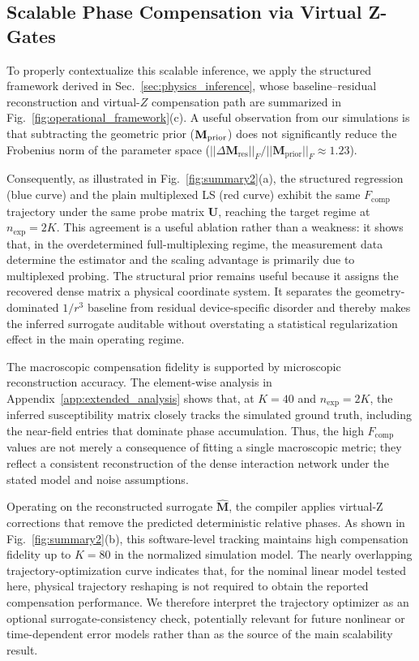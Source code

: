 \documentclass[a4paper,twocolumn,11pt]{quantumarticle}
\begin{document}
\subsection{Scalable Phase Compensation via Virtual Z-Gates}
\label{sec:structured_recovery}

To properly contextualize this scalable inference, we apply the structured framework derived in Sec.~\ref{sec:physics_inference}, whose baseline--residual reconstruction and virtual-$Z$ compensation path are summarized in Fig.~\ref{fig:operational_framework}(c). A useful observation from our simulations is that subtracting the geometric prior ($\mathbf M_{\rm prior}$) does not significantly reduce the Frobenius norm of the parameter space ($||\Delta\mathbf{M}_{\text{res}}||_F / ||\mathbf{M}_{\text{prior}}||_F \approx 1.23$). 

Consequently, as illustrated in Fig.~\ref{fig:summary2}(a), the structured regression (blue curve) and the plain multiplexed LS (red curve) exhibit the same $F_{\text{comp}}$ trajectory under the same probe matrix $\mathbf{U}$, reaching the target regime at $n_{\text{exp}}=2K$. This agreement is a useful ablation rather than a weakness: it shows that, in the overdetermined full-multiplexing regime, the measurement data determine the estimator and the scaling advantage is primarily due to multiplexed probing.
The structural prior remains useful because it assigns the recovered dense matrix a physical coordinate system. It separates the geometry-dominated $1/r^3$ baseline from residual device-specific disorder and thereby makes the inferred surrogate auditable without overstating a statistical regularization effect in the main operating regime.

The macroscopic compensation fidelity is supported by microscopic reconstruction accuracy. The element-wise analysis in Appendix~\ref{app:extended_analysis} shows that, at $K=40$ and $n_{\text{exp}}=2K$, the inferred susceptibility matrix closely tracks the simulated ground truth, including the near-field entries that dominate phase accumulation. Thus, the high $F_{\text{comp}}$ values are not merely a consequence of fitting a single macroscopic metric; they reflect a consistent reconstruction of the dense interaction network under the stated model and noise assumptions.

Operating on the reconstructed surrogate $\hat{\mathbf{M}}$, the compiler applies virtual-Z corrections that remove the predicted deterministic relative phases. As shown in Fig.~\ref{fig:summary2}(b), this software-level tracking maintains high compensation fidelity up to $K=80$ in the normalized simulation model. The nearly overlapping trajectory-optimization curve indicates that, for the nominal linear model tested here, physical trajectory reshaping is not required to obtain the reported compensation performance. We therefore interpret the trajectory optimizer as an optional surrogate-consistency check, potentially relevant for future nonlinear or time-dependent error models rather than as the source of the main scalability result.
\end{document}
